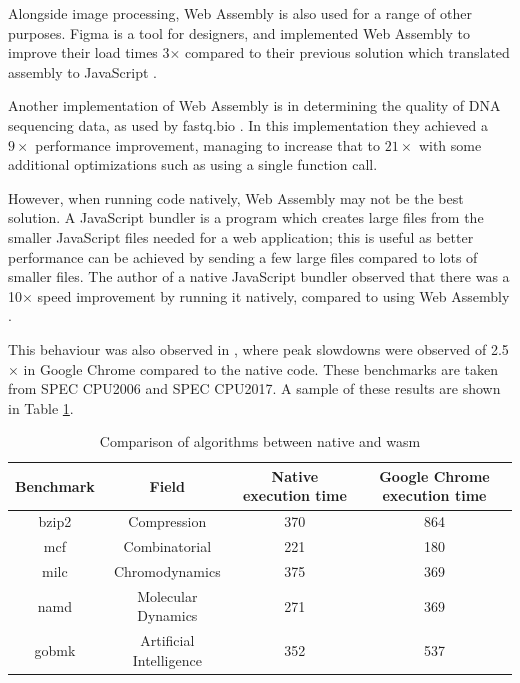 \documentclass[12pt,a4paper]{article}
\begin{document}
Alongside image processing, Web Assembly is also used for a range of other purposes. Figma is a tool for designers, and implemented Web Assembly to improve their load times 3$\times$ compared to their previous solution which translated assembly to JavaScript \cite{figmawasm}.

Another implementation of Web Assembly is in determining the quality of DNA sequencing data, as used by fastq.bio \cite{fastq}. In this implementation they achieved a $9\times $ performance improvement, managing to increase that to $21 \times$ with some additional optimizations such as using a single function call.


However, when running code natively, Web Assembly may not be the best solution. A JavaScript bundler is a program which creates large files from the smaller JavaScript files needed for a web application; this is useful as better performance can be achieved by sending a few large files compared to lots of smaller files. The author of a native JavaScript bundler observed that there was a 10$\times$ speed improvement by running it natively, compared to using Web Assembly \cite{esbuild}.

This behaviour was also observed in \cite{jangda2019not}, where peak slowdowns were observed of 2.5$\times$ in Google Chrome compared to the native code. These benchmarks are taken from SPEC CPU2006 and SPEC CPU2017. A sample of these results are shown in Table \ref{native}.
\begin{table}[H]
    \centering
    \caption{Comparison of algorithms between native and wasm}
    \vspace*{6pt}
    \label{native}
    \begin{tabular}{cccc}\hline\hline
        Benchmark & Field                   & Native execution time & Google Chrome execution time \\ \hline
        bzip2     & Compression             & 370                   & 864                          \\
        mcf       & Combinatorial           & 221                   & 180                          \\
        milc      & Chromodynamics          & 375                   & 369                          \\
        namd      & Molecular Dynamics      & 271                   & 369                          \\
        gobmk     & Artificial Intelligence & 352                   & 537
    \end{tabular}
\end{table}
\end{document}

